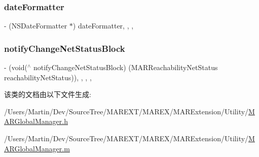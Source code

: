 \subsubsection{\texorpdfstring{date\+Formatter}{dateFormatter}}
{\footnotesize\ttfamily -\/ (N\+S\+Date\+Formatter $\ast$) date\+Formatter\hspace{0.3cm}{\ttfamily [read]}, {\ttfamily [write]}, {\ttfamily [nonatomic]}, {\ttfamily [strong]}}

\mbox{\label{interface_m_a_r_global_manager_a07a2b4dd14fb0b527eccb178bf465501}} 
\subsubsection{\texorpdfstring{notify\+Change\+Net\+Status\+Block}{notifyChangeNetStatusBlock}}
{\footnotesize\ttfamily -\/ (void($^\wedge$ notify\+Change\+Net\+Status\+Block) (M\+A\+R\+Reachability\+Net\+Status reachability\+Net\+Status))\hspace{0.3cm}{\ttfamily [read]}, {\ttfamily [write]}, {\ttfamily [nonatomic]}, {\ttfamily [copy]}, {\ttfamily [implementation]}}



该类的文档由以下文件生成\+:\begin{DoxyCompactItemize}
\item 
/\+Users/\+Martin/\+Dev/\+Source\+Tree/\+M\+A\+R\+E\+X\+T/\+M\+A\+R\+E\+X/\+M\+A\+R\+Extension/\+Utility/\hyperlink{_m_a_r_global_manager_8h}{M\+A\+R\+Global\+Manager.\+h}\item 
/\+Users/\+Martin/\+Dev/\+Source\+Tree/\+M\+A\+R\+E\+X\+T/\+M\+A\+R\+E\+X/\+M\+A\+R\+Extension/\+Utility/\hyperlink{_m_a_r_global_manager_8m}{M\+A\+R\+Global\+Manager.\+m}\end{DoxyCompactItemize}
